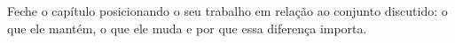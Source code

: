 Feche o capítulo posicionando o seu trabalho em relação ao conjunto discutido: o que ele mantém, o que ele muda e por que essa diferença importa.

